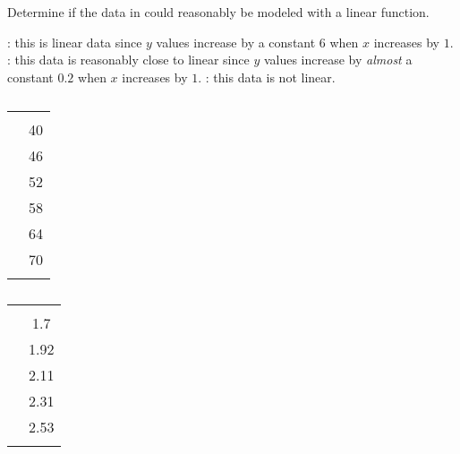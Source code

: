 \begin{essentialskills}
	\begin{problem}
	Determine if the data in  could 
	reasonably be modeled with a linear function. 
	\begin{shortsolution}
		: this is linear data since $y$ values increase by a constant $6$ when $x$ increases by $1$.
		: this data is reasonably close to linear since $y$ values increase by \emph{almost} a constant $0.2$ when $x$ increases by $1$.
		: this data is not linear.
	\end{shortsolution}
	\end{problem}
											
	\begin{table}[!htb]
		\centering
		\null \hfill
		\begin{minipage}{0.25\textwidth}
			\centering
			\caption{} \label{exp:tab:lineardata}
			\begin{tabular}{S[table-format=4.0]S[table-format=2.0]}
				\beforeheading
				 &  \\          & 40            \\          & 46            \\          & 52            \\          & 58            \\          & 64            \\          & 70            \\\lastline
			\end{tabular}
		\end{minipage}
		\hfill
		\begin{minipage}{0.25\textwidth}
			\centering
			\caption{} \label{exp:tab:expdata}
			\begin{tabular}{S[table-format=2.0]S[table-format=1.2]}
				\beforeheading
				 &  \\            & 1.7           \\            & 1.92          \\            & 2.11          \\            & 2.31          \\            & 2.53          \\\normalline

\end{tabular}
\end{minipage}
\end{table}
\end{essentialskills}
